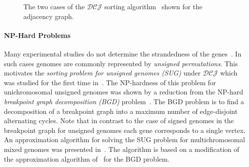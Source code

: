 \documentclass{svmult}
\newcommand{\m}[1]{\mathcal{#1}}
\begin{document}
\begin{figure}
	\centering
	\quad 
	\caption{The two cases of the $\m{DCJ}$ sorting algorithm~\cite{Bergeron_2006} shown for the adjacency graph.}
	\label{fig:dcj_algorithm_cases}
\end{figure}
%
%

\paragraph{NP-Hard Problems}

Many experimental studies do not determine the strandedness of the genes~\cite{Chen_2010}. 
In such cases genomes are commonly represented by
\emph{unsigned permutations}. This motivates the \emph{sorting problem for unsigned genomes (SUG)} under 
$\m{DCJ}$ which was studied for the first time in~\cite{Chen_2010}. The NP-hardness of this problem for 
unichromosomal unsigned genomes was shown by a reduction from the NP-hard 
\emph{breakpoint graph decomposition (BGD)} problem~\cite{Kececioglu_1995}. 
The BGD problem is to find a decomposition of a breakpoint graph into a maximum number of edge-disjoint 
alternating cycles. Note that in contrast to the case of signed genomes in the breakpoint graph for unsigned 
genomes each gene corresponds to a single vertex. 
An approximation algorithm for solving the SUG problem for multichromosomal
mixed genomes was presented in~\cite{Chen_2010}. The algorithm is based on a modification of the approximation algorithm of~\cite{Lin_2008} 
for the BGD problem. 
\end{document}
